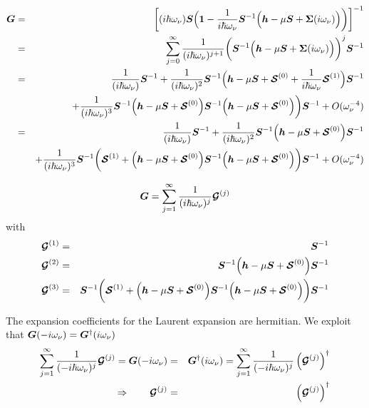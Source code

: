 \documentclass[11pt,a4paper]{report}
\begin{document}
\begin{eqnarray}
\bm{G}
&=&\biggl[(i\hbar\omega_\nu)\bm{S}
\Bigl(\bm{1}-\frac{1}{i\hbar\omega_\nu}
\bm{S}^{-1}
\Bigl(\bm{h}-\mu\bm{S}+\bm{\Sigma}(i\omega_\nu)\Bigr)\biggr)\biggr]^{-1}
\nonumber\\
&=&
\sum_{j=0}^\infty
\frac{1}{(i\hbar\omega_\nu)^{j+1}}
\biggl(
\bm{S}^{-1}\Bigl(\bm{h}-\mu\bm{S}+\bm{\Sigma}(i\omega_\nu)\Bigr)\biggr)^{j}
\bm{S}^{-1}
\nonumber\\
&=&
\frac{1}{(i\hbar\omega_\nu)}
\bm{S}^{-1}
+
\frac{1}{(i\hbar\omega_\nu)^2}
\bm{S}^{-1}\Bigl(\bm{h}-\mu\bm{S}
+\bm{\mathcal{S}}^{(0)}
+\frac{1}{i\hbar\omega_\nu}\bm{\mathcal{S}}^{(1)}
\Bigr)\bm{S}^{-1}
\nonumber\\
&&+
\frac{1}{(i\hbar\omega_\nu)^3}
\bm{S}^{-1}\Bigl(\bm{h}-\mu\bm{S}+\bm{\mathcal{S}}^{(0)}\Bigr)
\bm{S}^{-1}
\Bigl(\bm{h}-\mu\bm{S}+\bm{\mathcal{S}}^{(0)}\Bigr)\biggr)\bm{S}^{-1}
+O(\omega_\nu^{-4})
\nonumber\\
&=&
\frac{1}{(i\hbar\omega_\nu)}
\bm{S}^{-1}
+
\frac{1}{(i\hbar\omega_\nu)^2}
\bm{S}^{-1}\Bigl(\bm{h}-\mu\bm{S}
+\bm{\mathcal{S}}^{(0)}
\Bigr)\bm{S}^{-1}
\nonumber\\
&&+
\frac{1}{(i\hbar\omega_\nu)^3}
\bm{S}^{-1}
\biggl(
\bm{\mathcal{S}}^{(1)}
+
\Bigl(\bm{h}-\mu\bm{S}+\bm{\mathcal{S}}^{(0)}\Bigr)\bm{S}^{-1}
\Bigl(\bm{h}-\mu\bm{S}+\bm{\mathcal{S}}^{(0)}\Bigr)
\biggr)
\bm{S}^{-1}
+O(\omega_\nu^{-4})
\end{eqnarray}

\begin{eqnarray}
\bm{G}=\sum_{j=1}^\infty \frac{1}{(i\hbar\omega_\nu)^j}\bm{\mathcal{G}}^{(j)}
\end{eqnarray}
with
\begin{eqnarray}
\bm{\mathcal{G}}^{(1)}
&=&\bm{S}^{-1}
\nonumber\\
\bm{\mathcal{G}}^{(2)}
&=&\bm{S}^{-1}
\Bigl(\bm{h}-\mu\bm{S}
+\bm{\mathcal{S}}^{(0)}
\Bigr)\bm{S}^{-1}
\nonumber\\
\bm{\mathcal{G}}^{(3)}
&=&\bm{S}^{-1}
\biggl(
\bm{\mathcal{S}}^{(1)}
+
\Bigl(\bm{h}-\mu\bm{S}+\bm{\mathcal{S}}^{(0)}\Bigr)\bm{S}^{-1}
\Bigl(\bm{h}-\mu\bm{S}+\bm{\mathcal{S}}^{(0)}\Bigr)
\biggr)
\bm{S}^{-1}
\end{eqnarray}


The expansion coefficients for the Laurent expansion are hermitian.
We exploit that $\bm{G}(-i\omega_\nu)=\bm{G}^\dagger(i\omega_\nu)$
\begin{eqnarray}
\sum_{j=1}^\infty\frac{1}{(-i\hbar\omega_\nu)^j}\bm{\mathcal{G}}^{(j)}
=\bm{G}(-i\omega_\nu)&=&\bm{G}^\dagger(i\omega_\nu)
=\sum_{j=1}^\infty\frac{1}{(-i\hbar\omega_\nu)^j}
\left(\bm{\mathcal{G}}^{(j)}\right)^\dagger
\nonumber\\
\Rightarrow\qquad
\bm{\mathcal{G}}^{(j)}&=&\left(\bm{\mathcal{G}}^{(j)}\right)^\dagger
\end{eqnarray}
\end{document}
